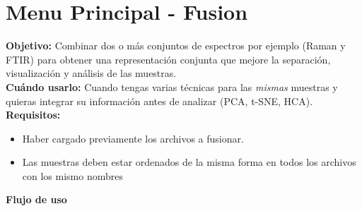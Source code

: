 \documentclass[12pt]{article}
\begin{document}
\section{Menu Principal - Fusion}
\textbf{Objetivo:} Combinar dos o más conjuntos de espectros por ejemplo (Raman y FTIR) para obtener una representación conjunta que mejore la separación, visualización y análisis de las muestras.\\
    \textbf{Cuándo usarlo:} Cuando tengas varias técnicas para las \textit{mismas} muestras y quieras integrar su información antes de analizar (PCA, t-SNE, HCA). \\
    \textbf{Requisitos:}
   \begin{itemize}
   \item Haber cargado previamente los archivos a fusionar.
   \item Las muestras deben estar ordenados de la misma forma en todos los archivos con los mismo nombres
    \end{itemize}
    \textbf{Flujo de uso}
\end{document}
